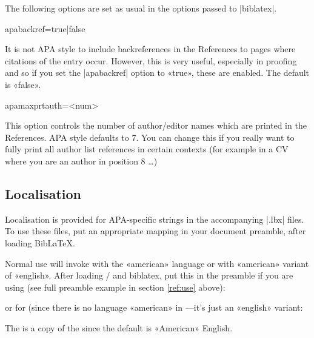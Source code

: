 \documentclass{ltxdockit}
\begin{document}
The following options are set as usual in the options passed to
|biblatex|.

\begin{ltxcode}
apabackref=true|false
\end{ltxcode}%

\noindent It is not APA style to include backreferences in the References to
pages where citations of the entry occur. However, this is very
useful, especially in proofing and so if you set the |apabackref|
option to «true», these are enabled. The default is «false».

\begin{ltxcode}
apamaxprtauth=<num>
\end{ltxcode}

\noindent This option controls the number of author/editor names which are
printed in the References. APA style defaults to 7. You can change this if
you really want to fully print all author list references in certain
contexts (for example in a CV where you are an author in position 8 \ldots)

\subsection{Localisation}

Localisation is provided for APA-specific strings in the accompanying
|.lbx| files. To use these files, put an appropriate mapping in your
document preamble, after loading Bib\LaTeX.

Normal use will invoke  with the «american» language or
 with «american» variant of «english». After
loading / and biblatex, put this in the
preamble if you are using  (see full preamble example in section
\ref{ref:use} above):

\begin{ltxcode}
\end{ltxcode}

or for  (since there is no language «american» in
---it's just an «english» variant:

\begin{ltxcode}
\end{ltxcode}

The  is a copy of the  since
the default is «American» English.
\end{document}
